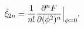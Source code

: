 \begin{equation}
\tilde\xi_{2n}=
{1\over n!}{\partial^n F\over\partial (\phi^2)^n}\Big|_{\phi=0}.
\end{equation}

